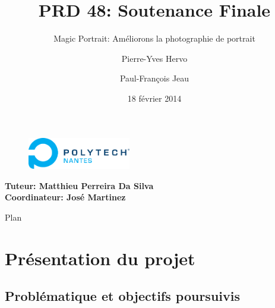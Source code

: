 \documentclass{beamer}
\title{PRD 48: Soutenance Finale}
\subtitle{Magic Portrait: Améliorons la photographie de portrait}
\author{Pierre-Yves Hervo \and Paul-François Jeau}
\date{18 février 2014}
\begin{document}
\begin{frame}
    \titlepage
    \begin{center}
        \begin{figure}
		    \includegraphics[width=0.4\textwidth]{PolytechNantes}
        \end{figure}
        \textbf{Tuteur: Matthieu Perreira Da Silva\\
	            Coordinateur: José Martinez}
	\end{center}
\end{frame}

\begin{frame}{Plan}
\tableofcontents
\end{frame}

\section{Présentation du projet}

\subsection{Problématique et objectifs poursuivis}
\end{document}

